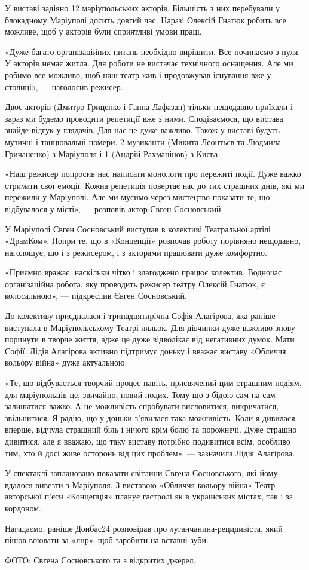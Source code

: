 У виставі задіяно 12 маріупольських акторів. Більшість з них перебували у
блокадному Маріуполі досить довгий час. Наразі Олексій Гнатюк робить все
можливе, щоб у акторів були сприятливі умови праці.

«Дуже багато організаційних питань необхідно вирішити. Все починаємо з нуля. У
акторів немає житла. Для роботи не вистачає технічного оснащення. Але ми робимо
все можливо, щоб наш театр жив і продовжував існування вже у столиці», —
наголосив режисер.

Двоє акторів (Дмитро Гриценко і Ганна Лафазан) тільки нещодавно приїхали і
зараз ми будемо проводити репетиції вже з ними. Сподіваємося, що вистава знайде
відгук у глядачів. Для нас це дуже важливо. Також у виставі будуть музичні і
танцювальні номери. 2 музиканти (Микита Леонтьєв та Людмила Гричаненко) з
Маріуполя і 1 (Андрій Рахманінов) з Києва. 

«Наш режисер попросив нас написати монологи про пережиті події. Дуже важко
стримати свої емоції. Кожна репетиція повертає нас до тих страшних днів, які ми
пережили у Маріуполі. Але ми мусимо через мистецтво показати те, що відбувалося
у місті», — розповів актор Євген Сосновський.

У Маріуполі Євген Сосновський виступав в колективі Театральної артілі
«ДрамКом». Попри те, що в «Концепції» розпочав роботу порівняно нещодавно,
наголошує, що і з режисером, і з акторами працювати дуже комфортно.

«Приємно вражає, наскільки чітко і злагоджено працює колектив. Водночас
організаційна робота, яку проводить режисер театру Олексій Гнатюк, є
колосальною», — підкреслив Євген Сосновський. 

До колективу приєдналася і тринадцятирічна Софія Алагірова, яка раніше
виступала в Маріупольському Театрі ляльок. Для дівчинки дуже важливо знову
поринути в творче життя, адже це дуже відволікає від негативних думок. Мати
Софії, Лідія Алагірова активно підтримує доньку і вважає виставу «Обличчя
кольору війна» дуже актуальною.

«Те, що відбувається творчий процес навіть, присвячений цим страшним подіям,
для маріупольців це, звичайно, новий подих. Тому що з бідою сам на сам
залишатися важко. А це можливість спробувати висловитися, викричатися,
звільнитися. Я радію, що у доньки з'явилася така можливість. Коли я дивилася
вперше, відчула страшний біль і нічого крім болю та порожнечі. Дуже страшно
дивитися, але я вважаю, що таку виставу потрібно подивитися всім, особливо тим,
хто й досі живе осторонь від цих проблем», — зазначила Лідія Алагірова. 

У спектаклі заплановано показати світлини Євгена Сосновського, які йому вдалося
вивезти з Маріуполя. З виставою «Обличчя кольору війна» Театр авторської п'єси
«Концепція» планує гастролі як в українських містах, так і за кордоном.

Нагадаємо, раніше Донбас24 розповідав про луганчанина-рецидивіста, який пішов
воювати за «лнр», щоб заробити на вставні зуби.

ФОТО: Євгена Сосновського та з відкритих джерел.
